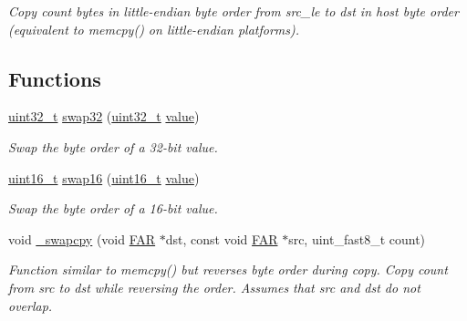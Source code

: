 \begin{DoxyCompactItemize}
\begin{DoxyCompactList}\small\item\em Copy {\itshape count} bytes in little-\/endian byte order from {\itshape src\-\_\-le} to {\itshape dst} in host byte order (equivalent to memcpy() on little-\/endian platforms). \end{DoxyCompactList}\end{DoxyCompactItemize}
\subsection*{Functions}
\begin{DoxyCompactItemize}
\item 
\hyperlink{group__hal__dos_ga09a1e304d66d35dd47daffee9731edaa}{uint32\-\_\-t} \hyperlink{group__util__byteorder_ga5bdbc60a02db00841f567d1ade52f877}{swap32} (\hyperlink{group__hal__dos_ga09a1e304d66d35dd47daffee9731edaa}{uint32\-\_\-t} \hyperlink{group__zcl_ga1ed5b151a90f7e99af8cca2e6875ddf4}{value})
\begin{DoxyCompactList}\small\item\em Swap the byte order of a 32-\/bit value. \end{DoxyCompactList}\item 
\hyperlink{group__hal_ga5a8b2dc9e45a9ee81a94ef304fb62505}{uint16\-\_\-t} \hyperlink{group__util__byteorder_ga7cf3526e1af5c8642d2ec02caecf99bc}{swap16} (\hyperlink{group__hal_ga5a8b2dc9e45a9ee81a94ef304fb62505}{uint16\-\_\-t} \hyperlink{group__zcl_ga1ed5b151a90f7e99af8cca2e6875ddf4}{value})
\begin{DoxyCompactList}\small\item\em Swap the byte order of a 16-\/bit value. \end{DoxyCompactList}\item 
void \hyperlink{group__util__byteorder_ga23fd4d4005a80a26ff3c6ba23a4af560}{\-\_\-swapcpy} (void \hyperlink{group__hal_gaef060b3456fdcc093a7210a762d5f2ed}{F\-A\-R} $\ast$dst, const void \hyperlink{group__hal_gaef060b3456fdcc093a7210a762d5f2ed}{F\-A\-R} $\ast$src, uint\-\_\-fast8\-\_\-t count)
\begin{DoxyCompactList}\small\item\em Function similar to memcpy() but reverses byte order during copy. Copy {\itshape count} from {\itshape src} to {\itshape dst} while reversing the order. Assumes that {\itshape src} and {\itshape dst} do not overlap. \end{DoxyCompactList}\end{DoxyCompactItemize}


